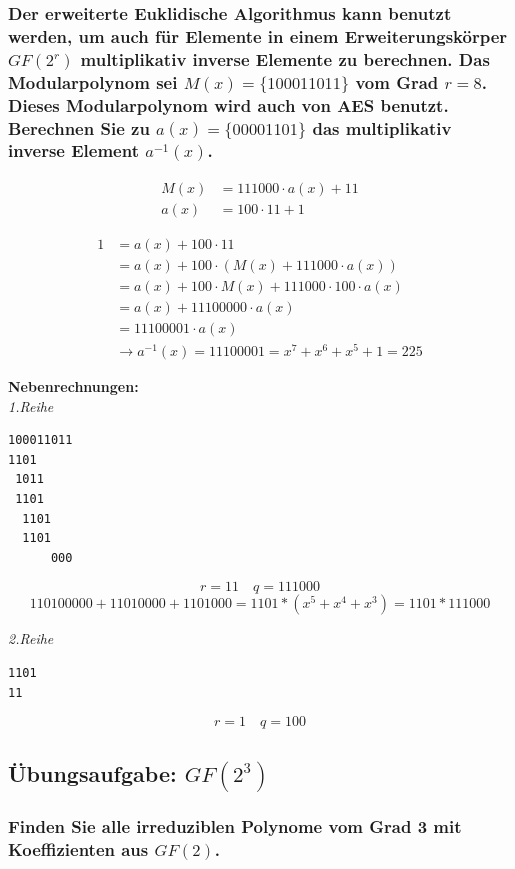 \subsubsection{Der erweiterte Euklidische Algorithmus kann benutzt werden, um auch für
Elemente in einem Erweiterungskörper $GF(2^r)$ multiplikativ inverse Elemente
zu berechnen. Das Modularpolynom sei $M(x)=\{100011011\}$ vom Grad $r=8$.
Dieses Modularpolynom wird auch von AES benutzt. Berechnen Sie zu
$a(x)=\{00001101\}$ das multiplikativ inverse Element $a^{-1}(x)$.}

\begin{align*}
M(x) &= {111000} \cdot a(x) + {11} \\
a(x) &= {100} \cdot {11} + {1}
\end{align*}

\begin{align}
{1} &= a(x) + {100} \cdot {11}                                                \\
    &= a(x) + {100} \cdot (M(x) + {111000} \cdot a(x)) \\ 
    &= a(x) + {100} \cdot M(x) + {111000} \cdot {100} \cdot a(x) \\
    &= a(x) + {11100000} \cdot a(x) \\ 
    &= {11100001} \cdot a(x)   \\ 
    &\rightarrow a^{-1}(x) = {11100001} = x^7 + x^6 + x^5 + 1 = {225}
\end{align}

\noindent
\textbf{Nebenrechnungen:} \\
\noindent
\textit{1.Reihe}
\begin{verbatim}
100011011
1101     
 1011
 1101
  1101               
  1101 
      000 
\end{verbatim}
\[ r = 11 \quad q = 111000 \]
\[ 110100000 + 11010000 + 1101000 = 1101 * (x^5+x^4+x^3) = 1101 * 111000 \]

\noindent
\textit{2.Reihe}
\begin{verbatim}
1101
11
\end{verbatim}
\[ r = 1 \quad q = 100 \]

\subsection{Übungsaufgabe: $GF(2^3)$}
\subsubsection{Finden Sie alle irreduziblen Polynome vom Grad 3 mit Koeffizienten aus
$GF(2)$.}

